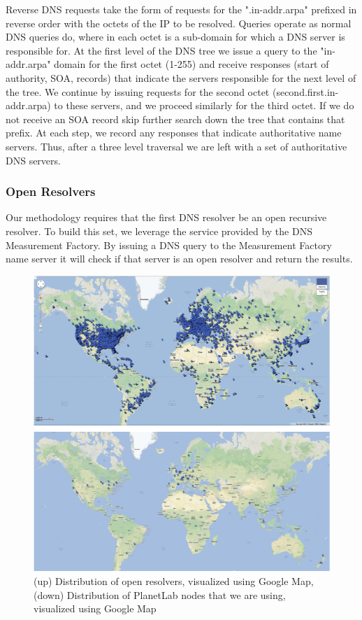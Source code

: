 Reverse DNS requests take the form of requests for the ".in-addr.arpa" prefixed in reverse order with the octets of the IP to be resolved. Queries operate as normal DNS queries do, where in each octet is a sub-domain for which a DNS server is responsible for.
At the first level of the DNS tree we issue a query to the "in-addr.arpa" domain for the first octet (1-255) and receive responses (start of authority, SOA, records) that indicate the servers responsible for the next level of the tree. We continue by issuing requests for the second octet (second.first.in-addr.arpa) to these servers, and we proceed similarly for the third octet. If we do not receive an SOA record skip further search down the tree that contains that prefix. At each step, we record any responses that indicate authoritative name servers. Thus, after a three level traversal we are left with a set of authoritative DNS servers.

\subsubsection{Open Resolvers}
Our methodology requires that the first DNS resolver be an open recursive resolver. To build this set, we leverage the service provided by the DNS Measurement Factory. By issuing a DNS query to the Measurement Factory name server it will check if that server is an open resolver and return the results.\cite{dnsfactory}

\begin{figure}
  \centering
  \includegraphics[width=\linewidth]{../figs/geo_viz.pdf}
  \caption{(up) Distribution of open resolvers, visualized using Google Map, (down) Distribution of PlanetLab nodes that we are using, visualized using Google Map}
  \label{fig:geo_viz}
\end{figure}

